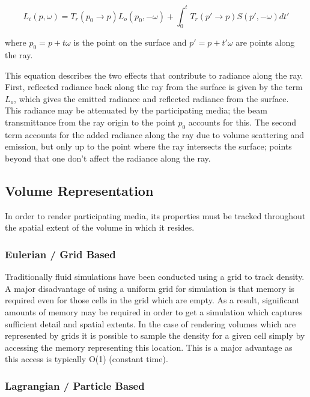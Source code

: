 \documentclass{article}
\begin{document}
\begin{equation}
L_{i}(p,\omega) = T_{r}(p_{0} \rightarrow p)L_{o}(p_{0}, -\omega) + \int_0^t T_{r}(p' \rightarrow p)S(p', -\omega)dt'
\end{equation}

where $p_{0} = p + t\omega$ is the point on the surface and $p' = p + t'\omega$ are points along the ray.

This equation describes the two effects that contribute to radiance along the ray. First, reflected radiance back along the ray from the surface is given by the term $L_{o}$, which gives the emitted radiance and reflected radiance from the surface. This radiance may be attenuated by the participating media; the beam transmittance from the ray origin to the point $p_{0}$ accounts for this. The second term accounts for the added radiance along the ray due to volume scattering and emission, but only up to the point where the ray intersects the surface; points beyond that one don't affect the radiance along the ray.

\subsection{Volume Representation}

In order to render participating media, its properties must be tracked throughout the spatial extent of the volume in which it resides. 

\subsubsection{Eulerian / Grid Based}

Traditionally fluid simulations have been conducted using a grid to track density.
\newline \newline
A major disadvantage of using a uniform grid for simulation is that memory is required even for those cells in the grid which are empty. As a result, significant amounts of memory may be required in order to get a simulation which captures sufficient detail and spatial extents.
\newline \newline
In the case of rendering volumes which are represented by grids it is possible to sample the density for a given cell simply by accessing the memory representing this location. This is a major advantage as this access is typically O(1) (constant time).

\subsubsection{Lagrangian / Particle Based}
\end{document}
